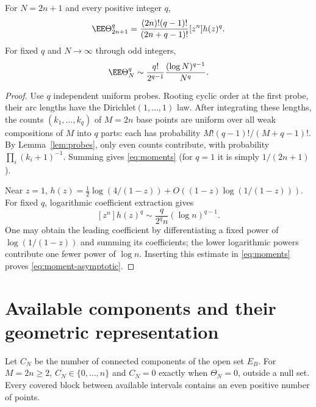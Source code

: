 \documentclass[11pt,letterpaper]{article}
\begin{document}
\begin{theorem}\label{thm:moments}
For $N=2n+1$ and every positive integer $q$,
\begin{equation}\label{eq:moments}
 \EE\Theta_{2n+1}^q
 =\frac{(2n)!(q-1)!}{(2n+q-1)!}[z^n]h(z)^q.
\end{equation}
For fixed $q$ and $N\to\infty$ through odd integers,
\begin{equation}\label{eq:moment-asymptotic}
 \EE\Theta_N^q\sim\frac{q!}{2^{q-1}}
 \frac{(\log N)^{q-1}}{N^q}.
\end{equation}
\end{theorem}
\begin{proof}
Use $q$ independent uniform probes. Rooting cyclic order at the first probe,
their arc lengths have the Dirichlet$(1,\ldots,1)$ law. After integrating
these lengths, the counts $(k_1,\ldots,k_q)$ of $M=2n$ base points are
uniform over all weak compositions of $M$ into $q$ parts: each has
probability $M!(q-1)!/(M+q-1)!$. By Lemma~\ref{lem:probes}, only even counts
contribute, with probability $\prod_i(k_i+1)^{-1}$. Summing gives
\eqref{eq:moments} (for $q=1$ it is simply $1/(2n+1)$).

Near $z=1$, $h(z)=\tfrac12\log(4/(1-z))+
O((1-z)\log(1/(1-z)))$. For fixed $q$, logarithmic coefficient extraction
gives
\[
 [z^n]h(z)^q\sim\frac{q}{2^q n}(\log n)^{q-1}.
\]
One may obtain the leading coefficient by differentiating a fixed power
of $\log(1/(1-z))$ and summing its coefficients; the lower logarithmic
powers contribute one fewer power of $\log n$. Inserting this estimate in
\eqref{eq:moments} proves \eqref{eq:moment-asymptotic}.
\end{proof}

\section{Available components and their geometric representation}\label{sec:components}

Let $C_N$ be the number of connected components of the open set $E_B$.
For $M=2n\ge2$, $C_N\in\{0,\ldots,n\}$ and $C_N=0$ exactly when
$\Theta_N=0$, outside a null set. Every covered block between available
intervals contains an even positive number of points.
\end{document}
